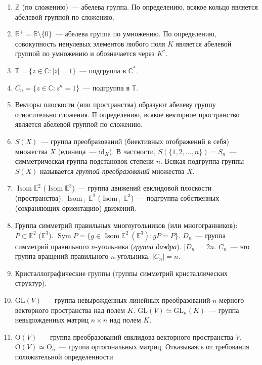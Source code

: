 \documentclass[a4paper]{article}
\renewcommand{\Isom}{\mathop{\mathrm{Isom}}\nolimits}
\newcommand{\Sym}{\mathop{\mathrm{Sym}}\nolimits}
\begin{document}
\begin{ex}
\begin{enumerate}
  \item $\mathbb{Z}$ (по сложению)~--- абелева группа. По определению,
  всякое кольцо является абелевой группой по сложению.
  \item $\mathbb{R}^+=\mathbb{R}\setminus \{0\}$~--- абелева группа по
  умножению. По определению, совокупность ненулевых элементов любого
  поля $K$ является абелевой группой по умножению и обозначается
  через $K^*$.
  \item $\mathbb{T}=\{z\in\mathbb{C}: |z|=1\}$~--- подгруппа в
  $\mathbb{C}^*$.
  \item $C_n=\{z\in\mathbb{C}: z^n=1\}$~--- подгруппа в
  $\mathbb{T}$.
  \item Векторы плоскости (или пространства) образуют абелеву группу
  относительно сложения. П определению, всякое векторное
  пространство является абелевой группой по сложению.
  \item $S(X)$~--- группа преобразований (биективных отображений в
  себя) множества $X$ (единица~--- $\mathrm{id}_X$). В частности, $S(\{1,2,\ldots,
  n\})=S_n$~--- симметрическая группа подстановок степени $n$.
  Всякая подгруппа группы $S(X)$ называется \emph{группой
  преобразований} множества $X$.
  \item $\Isom \mathbb{E}^2$ ($\Isom\mathbb{E}^3$)~--- группа движений
  евклидовой плоскости (пространства). $\Isom_+ \mathbb{E}^2$
  ($\Isom_+\mathbb{E}^3$)~--- подгруппа собственных (сохраняющих ориентацию)
  движений.
  \item Группа симметрий правильных многоугольников
  (или многогранников): $P\subset \mathbb{E}^2$ ($\mathbb{E}^3$). $\Sym P=
  \{g\in\Isom \mathbb{E}^2 \: (\mathbb{E}^3): gP=P\}$. $D_n$~---
  группа симметрий правильного $n$-угольника (\emph{группа диэдра}).
  $|D_n|=2n$. $C_n$~--- это группа вращений правильного
  $n$-угольника. $|C_n|=n$.
  \item Кристаллографические группы (группы симметрий кристаллических
  структур).
  \item $\mathrm{\mathrm{GL}}(V)$~--- группа невырожденных линейных преобразований
  $n$-мерного векторного пространства над полем $K$. $\mathrm{\mathrm{GL}}(V)\simeq
  \mathrm{\mathrm{GL}}_n(K)$~--- группа невырожденных матриц $n\times n$ над полем
  $K$.
  \item $\mathrm{O}(V)$~--- группа преобразований евклидова векторного
  пространства $V$. $\mathrm{O}(V)\simeq \mathrm{O}_n$~--- группа ортогональных
  матриц. Отказываясь от требования положительной определенности

\end{enumerate}
\end{ex}
\end{document}
